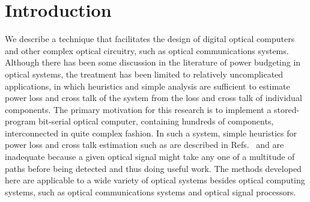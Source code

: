 \maketitle

\begin{abstract}
Complex optical computer designs must implicitly or explicitly allow for
power budgeting, to compensate for cross talk and loss in both devices and
interconnections.  We develop algorithms for calculating the system cross
talk and power loss in optical systems, using a graph-theoretic model.
Devices are modeled as directed graphs with nodes representing inputs and
outputs, and edges are weighted with the power relationships between nodes.
Systems are modeled by interconnecting the individual device graphs in a
manner that reflects the connectivity of the system.  A system's power
budget is efficiently computed by a depth-first search of its graph.  The
algorithms have been incorporated into an optical computer-aided design
system that is now being used to design a bit-serial optical computer
containing hundreds of components.

Key words: Optical computing, optical systems, optical communications,
power loss, cross talk, graphs.
\begin{center}
{\copyright\ Optical Society of America, 1992.}
\end{center}
\end{abstract}

\section{ Introduction}
We describe a technique that facilitates the design of digital optical
computers and other complex optical circuitry, such as optical
communications systems.  Although there has been some discussion in the
literature of power budgeting in optical systems,\cite{1,2} the treatment
has been limited to relatively uncomplicated applications, in which
heuristics and simple analysis are sufficient to estimate power loss and
cross talk of the system from the loss and cross talk of individual
components.  The primary motivation for this research is to implement a
stored-program bit-serial optical computer,\cite{3,4} containing hundreds
of components, interconnected in quite complex fashion.  In such a system,
simple heuristics for power loss and cross talk estimation such as are
described in Refs.\  and  are inadequate
because a given optical signal might take any one of a multitude of paths
before being detected and thus doing useful work.  The methods developed
here are applicable to a wide variety of optical systems besides optical
computing systems, such as optical communications systems and optical
signal processors.

